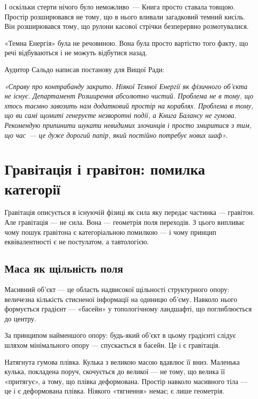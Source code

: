 \documentclass[12pt, a4paper, openany]{book}
\begin{document}
\begin{terrybox}
І оскільки стерти нічого було неможливо~--- Книга просто ставала товщою. Простір розширювався не тому, що в нього вливали загадковий темний кисіль. Він розширювався тому, що рулони касової стрічки безперервно розмотувалися.

«Темна Енергія» була не речовиною. Вона була просто вартістю того факту, що речі відбуваються і не можуть відбутися назад.

\medskip
Аудитор Сальдо написав постанову для Вищої Ради:

\medskip
\textit{«Справу про контрабанду закрито. Ніякої Темної Енергії як фізичного об'єкта не існує. Департамент Розширення абсолютно чистий. Проблема не в тому, що хтось таємно завозить нам додатковий простір на кораблях. Проблема в тому, що ви самі щомиті генеруєте незворотні події, а Книга Балансу не гумова. Рекомендую припинити шукати невидимих злочинців і просто змиритися з тим, що час~--- це дуже дорогий папір, який постійно потребує нових шаф».}
\end{terrybox}

\chapter{Гравітація і гравітон: помилка категорії}

Гравітація описується в існуючій фізиці як сила яку передає частинка --- гравітон. Але гравітація — не сила. Вона — геометрія поля переходів. З цього випливає чому пошук гравітона є категоріальною помилкою --- і чому принцип еквівалентності є не постулатом, а тавтологією.

\section{Маса як щільність поля}

Масивний об'єкт --- це область надвисокої щільності структурного опору: величезна кількість стисненої інформації на одиницю об'єму. Навколо нього формується градієнт --- «басейн» у топологічному ландшафті, що поглиблюється до центру.

За принципом найменшого опору: будь-який об'єкт в цьому градієнті слідує шляхом мінімального опору --- спускається в басейн. Це і є гравітація.

\begin{analogybox}
Натягнута гумова плівка. Кулька з великою масою вдавлює її вниз. Маленька кулька, покладена поруч, скочується до великої --- не тому, що велика її «притягує», а тому, що плівка деформована. Простір навколо масивного тіла --- це і є деформована плівка. Ніякого «тягнення» немає; є лише геометрія.
\end{analogybox}
\end{document}
